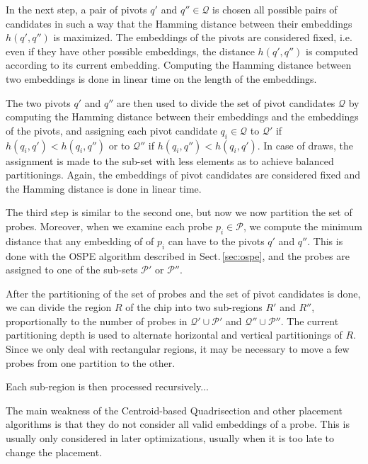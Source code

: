 \documentclass{llncs}
\begin{document}
In the next step, a pair of pivots $q'$ and $q'' \in \mathcal{Q}$ is chosen
all possible pairs of candidates in such a way that the Hamming distance between
their embeddings $h(q', q'')$ is maximized. The embeddings of the pivots are considered fixed,
i.e. even if they have other possible embeddings, the distance $h(q', q'')$ is computed
according to its current embedding. Computing the Hamming distance between two embeddings
is done in linear time on the length of the embeddings.

The two pivots $q'$ and $q''$ are then used to divide the set of pivot candidates $\mathcal{Q}$
by computing the Hamming distance between their embeddings and the embeddings of the pivots, and
assigning each pivot candidate $q_i \in \mathcal{Q}$ to $\mathcal{Q}'$ if
$h(q_i, q') < h(q_i, q'')$ or to $\mathcal{Q}''$ if $h(q_i, q'') < h(q_i, q')$. In case of draws,
the assignment is made to the sub-set with less elements as to achieve balanced partitionings.
Again, the embeddings of pivot candidates are considered fixed and the Hamming distance is done
in linear time.

The third step is similar to the second one, but now we now partition the set of probes.
Moreover, when we examine each probe $p_i \in \mathcal{P}$, we compute the minimum
distance that any embedding of of $p_i$ can have to the pivots $q'$ and $q''$. This is done with
the OSPE algorithm described in Sect.\,\ref{sec:ospe}, and the probes are assigned to one of the
sub-sets $\mathcal{P}'$ or $\mathcal{P}''$.

After the partitioning of the set of probes and the set of pivot candidates is done, we can
divide the region $R$ of the chip into two sub-regions $R'$ and $R''$, proportionally to the
number of probes in $\mathcal{Q}' \cup \mathcal{P}'$ and $\mathcal{Q}'' \cup \mathcal{P}''$.
The current partitioning depth is used to alternate horizontal and vertical partitionings of $R$.
Since we only deal with rectangular regions, it may be necessary to move a few probes
from one partition to the other.

Each sub-region is then processed recursively...

The main weakness of the Centroid-based Quadrisection and other placement algorithms is that
they do not consider all valid embeddings of a probe. This is usually only considered in later
optimizations, usually when it is too late to change the placement.

\end{document}
